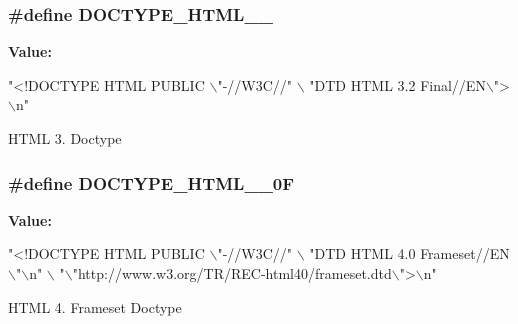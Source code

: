\subsubsection[{\texorpdfstring{D\+O\+C\+T\+Y\+P\+E\+\_\+\+H\+T\+M\+L\+\_\+3\+\_\+2}{DOCTYPE_HTML_3_2}}]{\setlength{\rightskip}{0pt plus 5cm}\#define D\+O\+C\+T\+Y\+P\+E\+\_\+\+H\+T\+M\+L\+\_\+\_}\hypertarget{group__APACHE__CORE__DAEMON_ga979c3a0415bdbf6011e4ac998aab20d2}{}\label{group__APACHE__CORE__DAEMON_ga979c3a0415bdbf6011e4ac998aab20d2}
{\bfseries Value\+:}
\begin{DoxyCode}
\textcolor{stringliteral}{"<!DOCTYPE HTML PUBLIC \(\backslash\)"-//W3C//"} \(\backslash\)
                          \textcolor{stringliteral}{"DTD HTML 3.2 Final//EN\(\backslash\)">\(\backslash\)n"}
\end{DoxyCode}
H\+T\+ML 3. Doctype 
\subsubsection[{\texorpdfstring{D\+O\+C\+T\+Y\+P\+E\+\_\+\+H\+T\+M\+L\+\_\+4\+\_\+0F}{DOCTYPE_HTML_4_0F}}]{\setlength{\rightskip}{0pt plus 5cm}\#define D\+O\+C\+T\+Y\+P\+E\+\_\+\+H\+T\+M\+L\+\_\+\_\+0F}\hypertarget{group__APACHE__CORE__DAEMON_gabe311802e6b92d023b0e1ef8bdec62ee}{}\label{group__APACHE__CORE__DAEMON_gabe311802e6b92d023b0e1ef8bdec62ee}
{\bfseries Value\+:}
\begin{DoxyCode}
\textcolor{stringliteral}{"<!DOCTYPE HTML PUBLIC \(\backslash\)"-//W3C//"} \(\backslash\)
                          \textcolor{stringliteral}{"DTD HTML 4.0 Frameset//EN\(\backslash\)"\(\backslash\)n"} \(\backslash\)
                          \textcolor{stringliteral}{"\(\backslash\)"http://www.w3.org/TR/REC-html40/frameset.dtd\(\backslash\)">\(\backslash\)n"}
\end{DoxyCode}
H\+T\+ML 4. Frameset Doctype 
